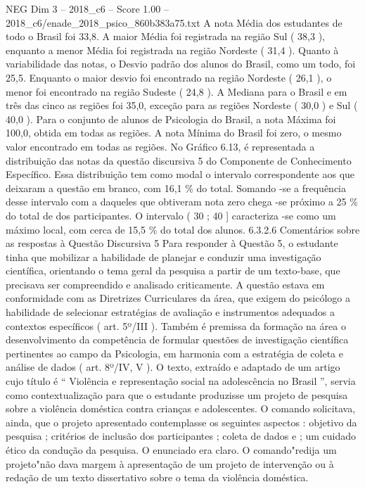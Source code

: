 \begin{textsample}{NEG Dim 3 – 2018\_c6 – Score 1.00 – 2018\_c6/enade\_2018\_psico\_860b383a75.txt}
A nota Média dos estudantes de todo o Brasil foi 33,8.
A maior Média foi registrada na região Sul ( 38,3 ), enquanto a menor Média foi registrada na região Nordeste ( 31,4 ).
Quanto à variabilidade das notas, o Desvio padrão dos alunos do Brasil, como um todo, foi 25,5.
Enquanto o maior desvio foi encontrado na região Nordeste ( 26,1 ), o menor foi encontrado na região Sudeste ( 24,8 ).
A Mediana para o Brasil e em três das cinco as regiões foi 35,0, exceção para as regiões Nordeste ( 30,0 ) e Sul ( 40,0 ).
Para o conjunto de alunos de Psicologia do Brasil, a nota Máxima foi 100,0, obtida em todas as regiões.
A nota Mínima do Brasil foi zero, o mesmo valor encontrado em todas as regiões.
No Gráfico 6.13, é representada a distribuição das notas da questão discursiva 5 do Componente de Conhecimento Específico.
Essa distribuição tem como modal o intervalo correspondente aos que deixaram a questão em branco, com 16,1 \% do total.
Somando -se a frequência desse intervalo com a daqueles que obtiveram nota zero chega -se próximo a 25 \% do total de dos participantes.
O intervalo ( 30 ; 40 ] caracteriza -se como um máximo local, com cerca de 15,5 \% do total dos alunos. 6.3.2.6 Comentários sobre as respostas à Questão Discursiva 5 Para responder à Questão 5, o estudante tinha que mobilizar a habilidade de planejar e conduzir uma investigação científica, orientando o tema geral da pesquisa a partir de um texto-base, que precisava ser compreendido e analisado criticamente.
A questão estava em conformidade com as Diretrizes Curriculares da área, que exigem do psicólogo a habilidade de selecionar estratégias de avaliação e instrumentos adequados a contextos específicos ( art. 5º/III ).
Também é premissa da formação na área o desenvolvimento da competência de formular questões de investigação científica pertinentes ao campo da Psicologia, em harmonia com a estratégia de coleta e análise de dados ( art. 8º/IV, V ).
O texto, extraído e adaptado de um artigo cujo título é “ Violência e representação social na adolescência no Brasil ”, servia como contextualização para que o estudante produzisse um projeto de pesquisa sobre a violência doméstica contra crianças e adolescentes.
O comando solicitava, ainda, que o projeto apresentado contemplasse os seguintes aspectos : objetivo da pesquisa ; critérios de inclusão dos participantes ; coleta de dados e ; um cuidado ético da condução da pesquisa.
O enunciado era claro.
O comando"redija um projeto"não dava margem à apresentação de um projeto de intervenção ou à redação de um texto dissertativo sobre o tema da violência doméstica.

\end{textsample}
